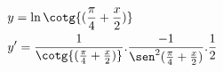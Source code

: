 \begin{ex}
\begin{align}
&y=\ln{\cotg{(\frac{\pi}{4}+\frac{x}{2})}}\nonumber\\
&y'=\frac{1}{\cotg{(\frac{\pi}{4}+\frac{x}{2})}}.\frac{-1}{\sen^2{(\frac{\pi}{4}+\frac{x}{2})}}.\frac{1}{2}\nonumber
\end{align}
\end{ex}
